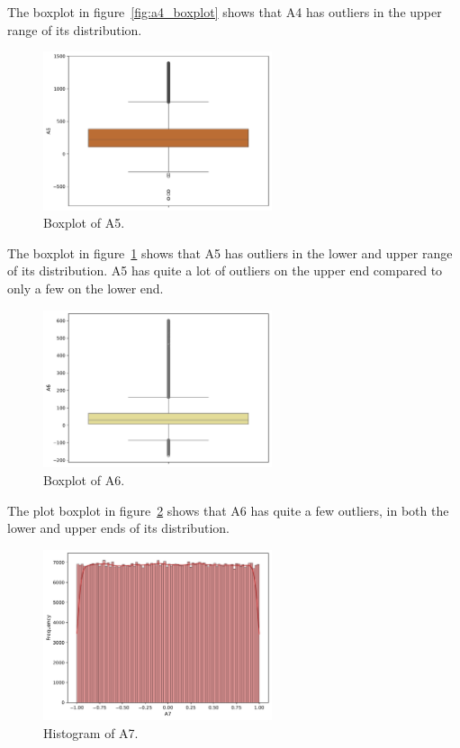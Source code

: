 \documentclass[11pt]{report}
\begin{document}
The boxplot in figure~\ref{fig:a4_boxplot} shows that A4 has outliers in the upper range of its distribution.

\begin{figure}[H]
    \centering
    \includegraphics[width=0.6\textwidth]{images/A5_boxplot.pdf}
    \caption{Boxplot of A5.}
    \label{fig:a5_boxplot}
\end{figure}

The boxplot in figure~\ref{fig:a5_boxplot} shows that A5 has outliers in the lower and upper range of its distribution. A5 has quite a lot of outliers on the upper end compared to only a few on the lower end.

\begin{figure}[H]
    \centering
    \includegraphics[width=0.6\textwidth]{images/A6_boxplot.pdf}
    \caption{Boxplot of A6.}
    \label{fig:a6_boxplot}
\end{figure}

The plot boxplot in figure~\ref{fig:a6_boxplot} shows that A6 has quite a few outliers, in both the lower and upper ends of its distribution.

\begin{figure}[H]
    \centering
    \includegraphics[width=0.6\textwidth]{images/A7_histplot.pdf}
    \caption{Histogram of A7.}
    \label{fig:a7_histplot}
\end{figure}
\end{document}
